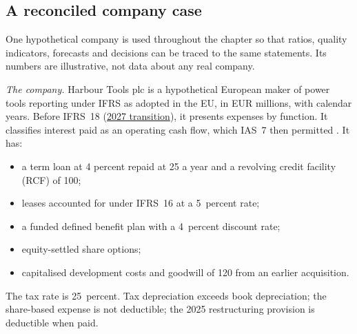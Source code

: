 \subsection{A reconciled company case}

One hypothetical company is used throughout the chapter so that ratios, quality indicators, forecasts and decisions can be traced to the same statements. Its numbers are illustrative, not data about any real company.

\begin{qfexample}\label{ex:harbour-tools-statements}
 \emph{The company.} Harbour Tools plc is a hypothetical European maker of power tools reporting under IFRS as adopted in the EU, in EUR millions, with calendar years. Before IFRS~18 (\hyperref[meth:accounting-change-effects]{2027 transition}), it presents expenses by function. It classifies interest paid as an operating cash flow, which IAS~7 then permitted \citep[IAS~7 paras.~31--33]{eu-2023-1803-ias7}. It has:
\begin{itemize}
\item a term loan at 4 percent repaid at 25 a year and a revolving credit facility (RCF) of 100;
\item leases accounted for under IFRS~16 at a 5~percent rate;
\item a funded defined benefit plan with a 4~percent discount rate;
\item equity-settled share options;
\item capitalised development costs and goodwill of 120 from an earlier acquisition.
\end{itemize}
The tax rate is 25~percent. Tax depreciation exceeds book depreciation; the share-based expense is not deductible; the 2025 restructuring provision is deductible when paid.


\end{qfexample}
